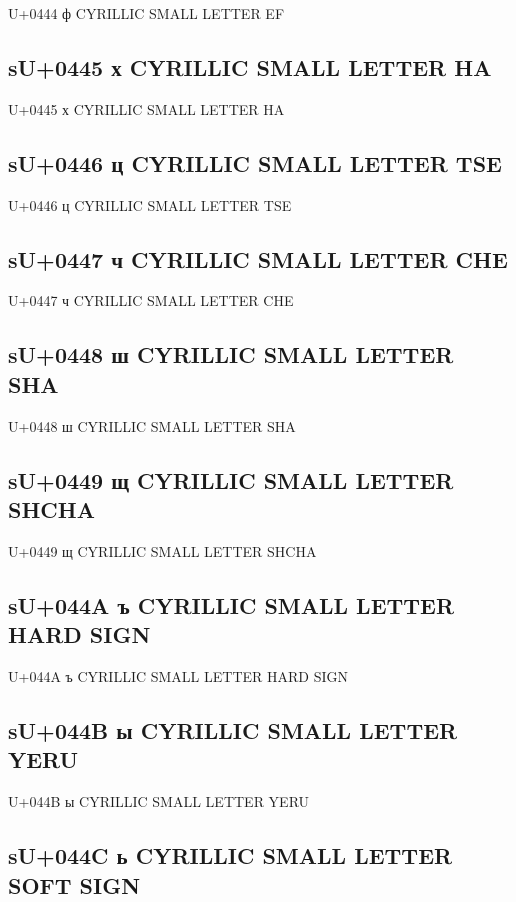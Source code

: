 U+0444 ф  CYRILLIC SMALL LETTER EF

\subsection{sU+0445 х  CYRILLIC SMALL LETTER HA}

U+0445 х  CYRILLIC SMALL LETTER HA

\subsection{sU+0446 ц  CYRILLIC SMALL LETTER TSE}

U+0446 ц  CYRILLIC SMALL LETTER TSE

\subsection{sU+0447 ч  CYRILLIC SMALL LETTER CHE}

U+0447 ч  CYRILLIC SMALL LETTER CHE

\subsection{sU+0448 ш  CYRILLIC SMALL LETTER SHA}

U+0448 ш  CYRILLIC SMALL LETTER SHA

\subsection{sU+0449 щ  CYRILLIC SMALL LETTER SHCHA}

U+0449 щ  CYRILLIC SMALL LETTER SHCHA

\subsection{sU+044A ъ  CYRILLIC SMALL LETTER HARD SIGN}

U+044A ъ  CYRILLIC SMALL LETTER HARD SIGN

\subsection{sU+044B ы  CYRILLIC SMALL LETTER YERU}

U+044B ы  CYRILLIC SMALL LETTER YERU

\subsection{sU+044C ь  CYRILLIC SMALL LETTER SOFT SIGN}

